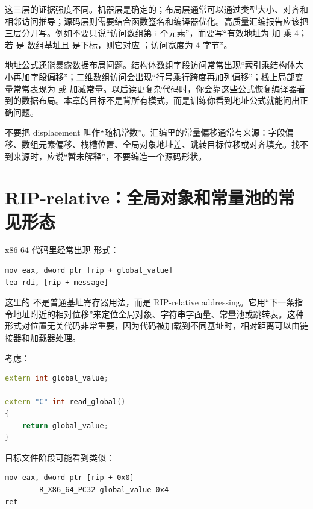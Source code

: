 这三层的证据强度不同。机器层是确定的；布局层通常可以通过类型大小、对齐和相邻访问推导；源码层则需要结合函数签名和编译器优化。高质量汇编报告应该把三层分开写。例如不要只说“访问数组第 i 个元素”，而要写“有效地址为  加  乘 4；若  是  数组基址且  是下标，则它对应 ；访问宽度为 4 字节”。

地址公式还能暴露数据布局问题。结构体数组字段访问常常出现“索引乘结构体大小再加字段偏移”；二维数组访问会出现“行号乘行跨度再加列偏移”；栈上局部变量常常表现为  或  加减常量。以后读更复杂代码时，你会靠这些公式恢复编译器看到的数据布局。本章的目标不是背所有模式，而是训练你看到地址公式就能问出正确问题。

\begin{warningbox}
不要把 displacement 叫作“随机常数”。汇编里的常量偏移通常有来源：字段偏移、数组元素偏移、栈槽位置、全局对象地址差、跳转目标位移或对齐填充。找不到来源时，应说“暂未解释”，不要编造一个源码形状。
\end{warningbox}

\section{RIP-relative：全局对象和常量池的常见形态}

x86-64 代码里经常出现 \code{[rip + ...]} 形式：

\begin{lstlisting}
mov eax, dword ptr [rip + global_value]
lea rdi, [rip + message]
\end{lstlisting}

这里的  不是普通基址寄存器用法，而是 RIP-relative addressing。它用“下一条指令地址附近的相对位移”来定位全局对象、字符串字面量、常量池或跳转表。这种形式对位置无关代码非常重要，因为代码被加载到不同基址时，相对距离可以由链接器和加载器处理。

考虑：

\begin{lstlisting}[language=C++]
extern int global_value;

extern "C" int read_global()
{
    return global_value;
}
\end{lstlisting}

目标文件阶段可能看到类似：

\begin{lstlisting}
mov eax, dword ptr [rip + 0x0]
        R_X86_64_PC32 global_value-0x4
ret
\end{lstlisting}


